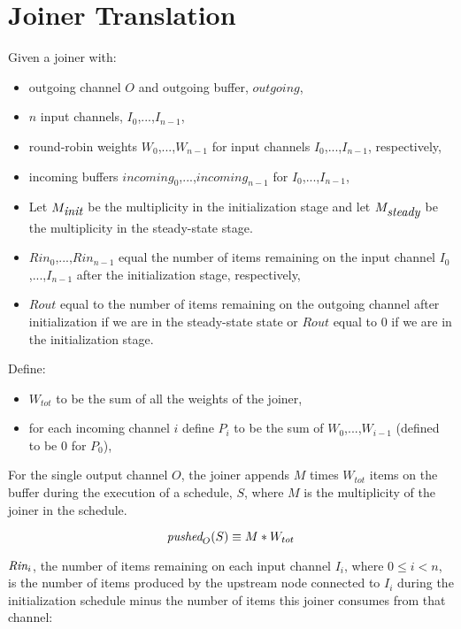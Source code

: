 \documentclass[10pt, letterpaper, onecolumn]{article}
\begin{document}
\section{Joiner Translation}
\label{joiner}
Given a joiner with:
\begin{itemize}
\item outgoing channel $O$ and outgoing buffer, $outgoing$,
\item $n$ input channels, $I_0$,...,$I_{n-1}$,
\item round-robin weights $W_0$,...,$W_{n-1}$ for input channels
 $I_0$,...,$I_{n-1}$, respectively,
\item incoming buffers ${incoming}_0$,...,${incoming}_{n-1}$ for
  $I_0$,...,$I_{n-1}$,
\item Let $M_{\mbox{\it init}}$ be the multiplicity in the initialization
  stage and let $M_{\mbox{\it steady}}$ be the multiplicity in the
  steady-state stage.
\item ${Rin}_0$,...,${Rin}_{n-1}$ equal the number of items remaining
  on the input channel $I_0$,...,$I_{n-1}$ after the initialization
  stage, respectively,
\item ${Rout}$ equal to the number of items remaining on the outgoing
  channel after initialization if we are in the steady-state state or
  ${Rout}$ equal to $0$ if we are in the initialization stage.
\end{itemize}

Define:
\begin{itemize}
\item $W_{tot}$ to be the sum of all the weights of the joiner,
\item for each incoming channel $i$ define $P_i$ to be the sum of
  $W_0$,...,$W_{i-1}$ (defined to be $0$ for $P_0$),
\end{itemize}

For the single output channel $O$, the joiner appends $M$ times $W_{tot}$
items on the buffer during the execution of a schedule, $S$, where $M$
is the multiplicity of the joiner in the schedule.

\begin{displaymath}
\mbox{\it pushed}_O(S) \equiv M * W_{tot}
\end{displaymath}

$\mbox{\it Rin}_i$, the number of items remaining on each input channel
$I_i$, where $0 \le i < n$, is the number of items produced by
the upstream node connected to $I_i$ during the initialization
schedule minus the number of items this joiner consumes from that
channel:
\end{document}
